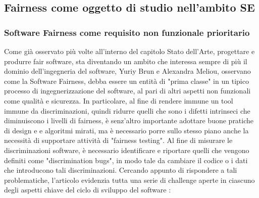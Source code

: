 \subsection{Fairness come oggetto di studio nell'ambito SE}
\subsubsection{Software Fairness come requisito non funzionale prioritario}
Come già osservato più volte all'interno del capitolo Stato dell'Arte, progettare e produrre fair software, sta diventando un ambito che interessa sempre di più il dominio dell'ingegneria del software, Yuriy Brun e Alexandra Meliou, \cite{brun2018software} osservano come la Software Fairness, debba essere un entità di "prima classe" in un tipico processo di ingegnerizzazione del software, al pari di altri aspetti non funzionali come qualità e sicurezza. In particolare, al fine di rendere immune un tool immune da discriminazioni, quindi ridurre quelli che sono i difetti intrinseci che diminuiscono i livelli di fairness, è senz'altro importante adottare buone pratiche di design e e algoritmi mirati, ma è necessario porre sullo stesso piano anche la necessità di supportare attività di "fairness testing". Al fine di misurare le discriminazioni software, è necessario identificare e riportare quelli che vengono definiti come "discrimination bugs", in modo tale da cambiare il codice o i dati che introducono tali discriminazioni. Cercando appunto di rispondere a tali problematiche, l'articolo evidenzia tutta una serie di challenge aperte in ciascuno degli aspetti chiave del ciclo di sviluppo del software \cite{brun2018software}:

